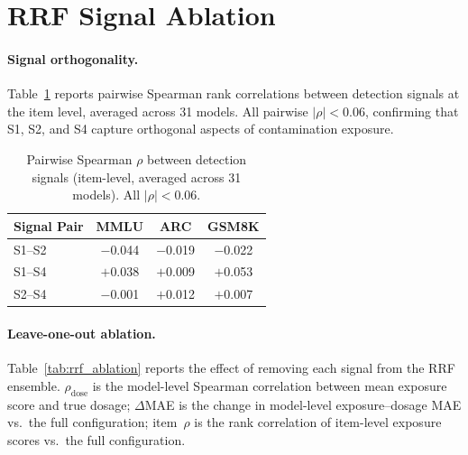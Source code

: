 \section{RRF Signal Ablation}
\label{sec:rrf_ablation}

\paragraph{Signal orthogonality.}
Table~\ref{tab:signal_correlation} reports pairwise Spearman rank correlations between detection signals at the item level, averaged across 31 models. All pairwise $|\rho| < 0.06$, confirming that S1, S2, and S4 capture orthogonal aspects of contamination exposure.

\begin{table}[h]
\centering
\caption{Pairwise Spearman $\rho$ between detection signals (item-level, averaged across 31 models). All $|\rho| < 0.06$.}
\label{tab:signal_correlation}
\footnotesize
\begin{tabular}{lccc}
\toprule
Signal Pair & MMLU & ARC & GSM8K \\
\midrule
S1--S2 & $-$0.044 & $-$0.019 & $-$0.022 \\
S1--S4 & $+$0.038 & $+$0.009 & $+$0.053 \\
S2--S4 & $-$0.001 & $+$0.012 & $+$0.007 \\
\bottomrule
\end{tabular}
\end{table}

\paragraph{Leave-one-out ablation.}
Table~\ref{tab:rrf_ablation} reports the effect of removing each signal from the RRF ensemble. $\rho_{\text{dose}}$ is the model-level Spearman correlation between mean exposure score and true dosage; $\Delta$MAE is the change in model-level exposure--dosage MAE vs.\ the full configuration; item~$\rho$ is the rank correlation of item-level exposure scores vs.\ the full configuration.

